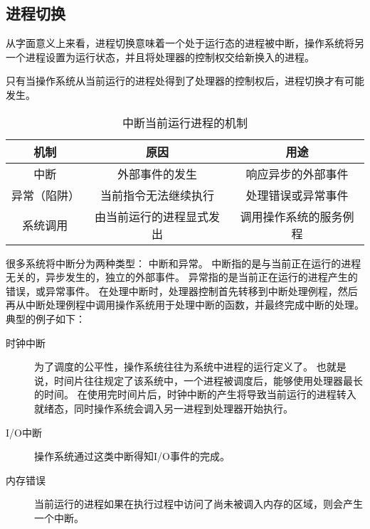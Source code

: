 {    \subsection{进程切换}
    {
        从字面意义上来看，进程切换意味着一个处于运行态的进程被中断，操作系统将另一个进程设置为运行状态，并且将处理器的控制权交给新换入的进程。

        {
            只有当操作系统从当前运行的进程处得到了处理器的控制权后，进程切换才有可能发生。

            \begin{table}[htb]
                \centering

                \caption{中断当前运行进程的机制}

                \begin{tabular}{c|c|c}
                    \hline
                    机制 & 原因 & 用途 \\
                    \hline
                    中断 & 外部事件的发生 & 响应异步的外部事件 \\
                    \hline
                    异常（陷阱） & 当前指令无法继续执行 & 处理错误或异常事件 \\
                    \hline
                    系统调用 & 由当前运行的进程显式发出 & 调用操作系统的服务例程 \\
                    \hline
                \end{tabular}
            \end{table}

            很多系统将中断分为两种类型：
            中断和异常。
            中断指的是与当前正在运行的进程无关的，异步发生的，独立的外部事件。
            异常指的是当前正在运行的进程产生的错误，或异常事件。
            在处理中断时，处理器控制首先转移到中断处理例程，然后再从中断处理例程中调用操作系统用于处理中断的函数，并最终完成中断的处理。
            典型的例子如下：

            \begin{description}
                \item[时钟中断]
                {
                    为了调度的公平性，操作系统往往为系统中进程的运行定义了。
                    也就是说，时间片往往规定了该系统中，一个进程被调度后，能够使用处理器最长的时间。
                    在使用完时间片后，时钟中断的产生将导致当前运行的进程转入就绪态，同时操作系统会调入另一进程到处理器开始执行。
                }
                \item[I/O中断] 操作系统通过这类中断得知I/O事件的完成。
                \item[内存错误] 当前运行的进程如果在执行过程中访问了尚未被调入内存的区域，则会产生一个中断。
            \end{description}

}}}
